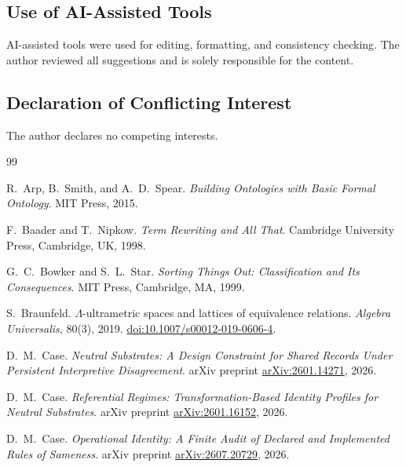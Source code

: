 \documentclass[11pt]{article}
\theoremstyle{plain}
\theoremstyle{definition}
\theoremstyle{remark}
\begin{document}
\subsection*{Use of AI-Assisted Tools}
AI-assisted tools were used for editing, formatting, and consistency checking.
The author reviewed all suggestions and is solely responsible for the content.

\subsection*{Declaration of Conflicting Interest}
The author declares no competing interests.

\begin{thebibliography}{99}
  \small

  R.\ Arp, B.\ Smith, and A.\ D.\ Spear.
  \emph{Building Ontologies with Basic Formal Ontology}.
  MIT Press, 2015.

  F.\ Baader and T.\ Nipkow.
  \emph{Term Rewriting and All That}.
  Cambridge University Press, Cambridge, UK, 1998.

  G.\ C.\ Bowker and S.\ L.\ Star.
  \emph{Sorting Things Out: Classification and Its Consequences}.
  MIT Press, Cambridge, MA, 1999.

  S.\ Braunfeld.
  \(\Lambda\)-ultrametric spaces and lattices of equivalence relations.
  \emph{Algebra Universalis}, 80(3), 2019.
  \href{https://doi.org/10.1007/s00012-019-0606-4}{doi:10.1007/s00012-019-0606-4}.

  D.\ M.\ Case.
  \emph{Neutral Substrates: A Design Constraint for Shared Records Under Persistent Interpretive Disagreement}.
  arXiv preprint \href{https://arxiv.org/abs/2601.14271}{arXiv:2601.14271}, 2026.

  D.\ M.\ Case.
  \emph{Referential Regimes: Transformation-Based Identity Profiles for Neutral Substrates}.
  arXiv preprint \href{https://arxiv.org/abs/2601.16152}{arXiv:2601.16152}, 2026.

  D.\ M.\ Case.
  \emph{Operational Identity: A Finite Audit of Declared and Implemented Rules of Sameness}.
  arXiv preprint \href{https://arxiv.org/abs/2607.20729}{arXiv:2607.20729}, 2026.


\end{thebibliography}
\end{document}
